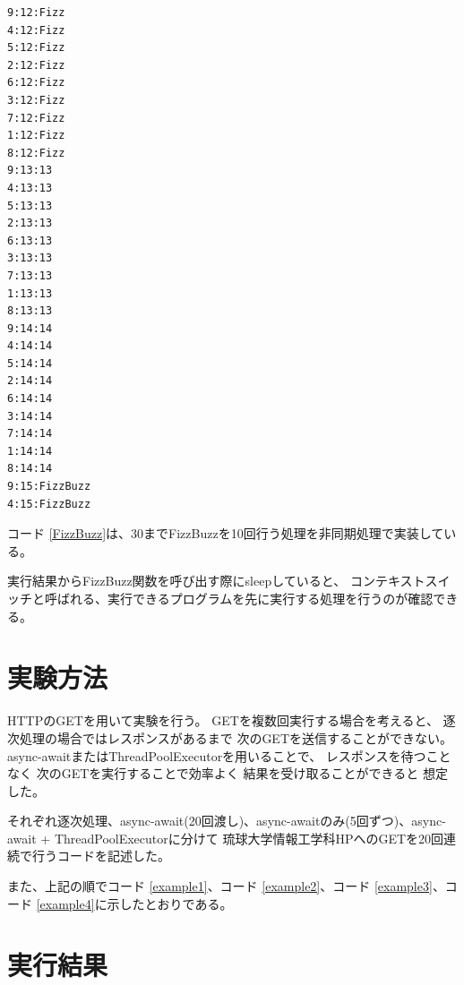 \documentclass[14pt, oneside]{article}     	%
\begin{document}


\begin{lstlisting}[caption=FizzBuzz実行結果]
9:12:Fizz
4:12:Fizz
5:12:Fizz
2:12:Fizz
6:12:Fizz
3:12:Fizz
7:12:Fizz
1:12:Fizz
8:12:Fizz
9:13:13
4:13:13
5:13:13
2:13:13
6:13:13
3:13:13
7:13:13
1:13:13
8:13:13
9:14:14
4:14:14
5:14:14
2:14:14
6:14:14
3:14:14
7:14:14
1:14:14
8:14:14
9:15:FizzBuzz
4:15:FizzBuzz
\end{lstlisting}

コード \ref{FizzBuzz}は、30までFizzBuzzを10回行う処理を非同期処理で実装している。

実行結果からFizzBuzz関数を呼び出す際にsleepしていると、
コンテキストスイッチと呼ばれる、実行できるプログラムを先に実行する処理を行うのが確認できる。


\section{実験方法}

HTTPのGETを用いて実験を行う。
GETを複数回実行する場合を考えると、
逐次処理の場合ではレスポンスがあるまで
次のGETを送信することができない。
async-awaitまたはThreadPoolExecutorを用いることで、
レスポンスを待つことなく
次のGETを実行することで効率よく
結果を受け取ることができると
想定した。

それぞれ逐次処理、async-await(20回渡し)、async-awaitのみ(5回ずつ)、async-await + ThreadPoolExecutorに分けて
琉球大学情報工学科HPへのGETを20回連続で行うコードを記述した。

また、上記の順でコード \ref{example1}、コード \ref{example2}、コード \ref{example3}、コード \ref{example4}に示したとおりである。











\newpage

\section{実行結果}
\end{document}
